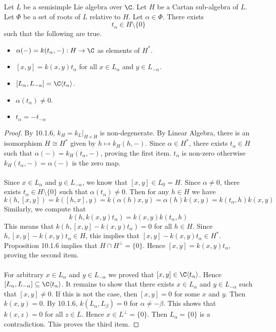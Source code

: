 \documentclass[a4paper]{article}
\begin{document}
\begin{lmm}{}{} Let $L$ be a semisimple Lie algebra over $\C$. Let $H$ be a Cartan sub-algebra of $L$. Let $\Phi$ be a set of roots of $L$ relative to $H$. Let $\alpha\in\Phi$. There exists $$t_\alpha\in H\setminus\{0\}$$ such that the following are true. 
\begin{itemize}
\item $\alpha(-)=k(t_\alpha,-):H\to\C$ as elements of $H^\ast$. 
\item $[x,y]=k(x,y)t_\alpha$ for all $x\in L_\alpha$ and $y\in L_{-\alpha}$. 
\item $[L_\alpha,L_{-\alpha}]=\C\langle t_\alpha\rangle$. 
\item $\alpha(t_\alpha)\neq 0$. 
\item $t_\alpha=-t_{-\alpha}$
\end{itemize} \tcbline
\begin{proof}
By 10.1.6, $k_H=k_L|_{H\times H}$ is non-degenerate. By Linear Algebra, there is an isomorphism $H\cong H^\ast$ given by $h\mapsto k_H(h,-)$. Since $\alpha\in H^\ast$, there exists $t_\alpha\in H$ such that $\alpha(-)=k_H(t_\alpha,-)$, proving the first item. $t_\alpha$ is non-zero otherwise $k_H(t_\alpha,-)=\alpha(-)$ is the zero map. \\~\\

Since $x\in L_\alpha$ and $y\in L_{-\alpha}$, we know that $[x,y]\in L_0=H$. Since $\alpha\neq 0$, there exists $t_\alpha\in H\setminus\{0\}$ such that $\alpha(t_\alpha)\neq 0$. Then for any $h\in H$ we have $$k(h,[x,y])=k([h,x],y)=k(\alpha(h)x,y)=\alpha(h)k(x,y)=k(t_\alpha,h)k(x,y)$$ Similarly, we compute that $$k(h,k(x,y)t_\alpha)=k(x,y)k(t_\alpha,h)$$ This means that $k(h,[x,y]-k(x,y)t_\alpha)=0$ for all $h\in H$. Since $h,[x,y]-k(x,y)t_\alpha\in H$, this implies that $[x,y]-k(x,y)t_\alpha\in H^\ast$. Proposition 10.1.6 implies that $H\cap H^\perp=\{0\}$. Hence $[x,y]=k(x,y)t_\alpha$, proving the second item. \\~\\

For arbitrary $x\in L_\alpha$ and $y\in L_{-\alpha}$ we proved that $[x,y]\in\C\langle t_\alpha\rangle$. Hence $[L_\alpha,L_{-\alpha}]\subseteq\C\langle t_\alpha\rangle$. It remains to show that there exists $x\in L_\alpha$ and $y\in L_{-\alpha}$ such that $[x,y]\neq 0$. If this is not the case, then $[x,y]=0$ for some $x$ and $y$. Then $k(x,y)=0$. By 10.1.6, $k(L_\alpha,L_\beta)=0$ for $\alpha\neq-\beta$. This shows that $k(x,z)=0$ for all $z\in L$. Hence $x\in L^\perp=\{0\}$. Then $L_\alpha=\{0\}$ is a contradiction. This proves the third item. 


\end{proof}
\end{lmm}
\end{document}
